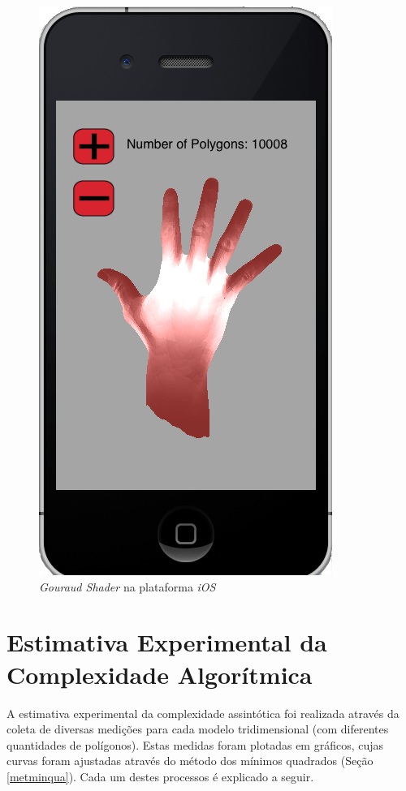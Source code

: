 	\begin{figure}[ht]
	\centering
		\includegraphics[keepaspectratio=true,scale=0.5]{figuras/gouraud_ios.png}
	\caption{\textit{Gouraud Shader} na plataforma \textit{iOS}}
	\label{gouraud_ios}
	\end{figure}

\section{Estimativa Experimental da Complexidade Algorítmica}

	A estimativa experimental da complexidade assintótica foi realizada através da coleta de diversas medições para cada modelo tridimensional (com diferentes quantidades de polígonos). Estas medidas foram plotadas em gráficos, cujas curvas foram ajustadas através do método dos mínimos quadrados (Seção \ref{metminqua}). Cada um destes processos é explicado a seguir.



